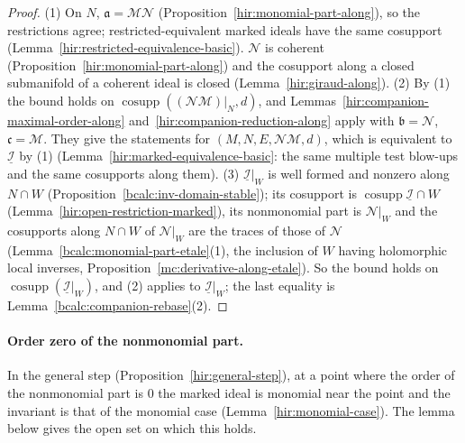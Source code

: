 \begin{proof}
\mixedleanok
(1) On \(N\), \(\mathfrak a=\mathcal M\mathcal N\) (Proposition~\ref{hir:monomial-part-along}), so the restrictions agree; restricted-equivalent marked ideals have the same cosupport
(Lemma~\ref{hir:restricted-equivalence-basic}). \(\mathcal N\) is coherent (Proposition~\ref{hir:monomial-part-along}) and the cosupport along a closed submanifold of a coherent
ideal is closed (Lemma~\ref{hir:giraud-along}). (2) By (1) the bound holds on \(\operatorname{cosupp}((\mathcal N\mathcal M)|_N,d)\), and
Lemmas~\ref{hir:companion-maximal-order-along} and~\ref{hir:companion-reduction-along} apply with \(\mathfrak b=\mathcal N\), \(\mathfrak c=\mathcal M\). They give the statements
for \((M,N,E,\mathcal N\mathcal M,d)\), which is equivalent to \(\underline{\mathcal I}\) by (1) (Lemma~\ref{hir:marked-equivalence-basic}: the same multiple test blow-ups and the
same cosupports along them). (3) \(\underline{\mathcal I}|_W\) is well formed and nonzero along \(N\cap W\) (Proposition~\ref{bcalc:inv-domain-stable}); its cosupport is
\(\operatorname{cosupp}\underline{\mathcal I}\cap W\) (Lemma~\ref{hir:open-restriction-marked}), its nonmonomial part is \(\mathcal N|_W\) and the cosupports along \(N\cap W\) of
\(\mathcal N|_W\) are the traces of those of \(\mathcal N\) (Lemma~\ref{bcalc:monomial-part-etale}(1), the inclusion of \(W\) having holomorphic local inverses,
Proposition~\ref{mc:derivative-along-etale}). So the bound holds on \(\operatorname{cosupp}(\underline{\mathcal I}|_W)\), and (2) applies to \(\underline{\mathcal I}|_W\); the last
equality is Lemma~\ref{bcalc:companion-rebase}(2).
\end{proof}

\paragraph{Order zero of the nonmonomial part.} In the general step (Proposition~\ref{hir:general-step}), at a point where the order of the nonmonomial
part is \(0\) the marked ideal is monomial near the point and the invariant is that of the monomial case (Lemma~\ref{hir:monomial-case}). The lemma below
gives the open set on which this holds.

